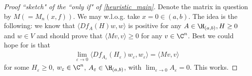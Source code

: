 \begin{proof}[Proof ``sketch" of the ``only if" of \ref{heuristic_main}]
	Denote the matrix in question by $M (= M_{n}(x, f))$. We may w.l.o.g. take $x = 0 \in (a, b)$. The idea is the following: we know that $\langle D f_{A} (H) w, w \rangle$ is positive for any $A \in \H_{(a, b)}, H \geq 0$ and $w \in V$ and should prove that $\langle M v, v \rangle \geq 0$ for any $v \in \C^{n}$. Best we could hope for is that
	\begin{align*}
		\lim_{\varepsilon \to 0} \langle D f_{A_{\varepsilon}} (H_{\varepsilon}) w_{\varepsilon}, w_{\varepsilon} \rangle = \langle M v, v \rangle
	\end{align*}
	for some $H_{\varepsilon} \geq 0$, $w_{\varepsilon} \in \C^{n}$, $A_{\varepsilon} \in \H_{(a, b)}$, with $\lim_{\varepsilon \to 0} A_{\varepsilon} = 0$. This works.


\end{proof}

